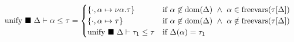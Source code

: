 \documentclass[sigplan,screen]{acmart}
\begin{document}
\begin{figure*}[h]
  \[
    \begin{array}{l @{} l}

      \text{unify } \blacksquare\ \Delta \vdash \alpha \leq \tau	
      &{} =
      \begin{cases}  
        \{ \cdot,\alpha \mapsto \nu\alpha.\tau \}
        & \text{if } 
        \alpha \not\in \text{dom}(\Delta) \ \wedge\
        \alpha \in \text{freevars}(\tau[\Delta])
        \\
        \{ \cdot,\alpha \mapsto \tau \}
        & \text{if } 
        \alpha \not\in \text{dom}(\Delta) \ \wedge\
        \alpha \notin \text{freevars}(\tau[\Delta])
        \\
        \text{unify } \blacksquare\ \Delta \vdash \tau_1 \leq \tau
        &\text{if }
        \Delta(\alpha) = \tau_1
      \end{cases}
      \\


\end{array}\]
\end{figure*}
\end{document}
